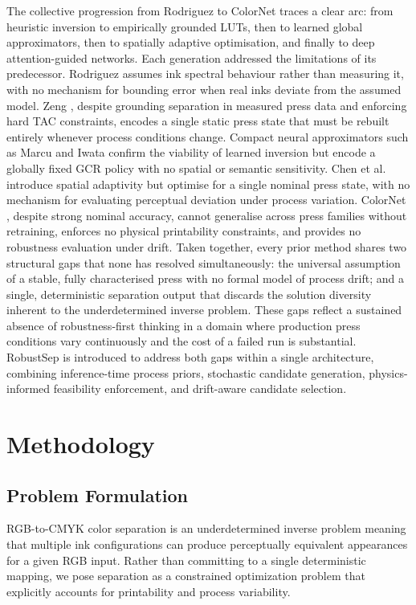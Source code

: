 \documentclass[11pt]{article}
\begin{document}
The collective progression from Rodriguez \cite{rodriguez} to ColorNet \cite{bo} traces a clear arc: from heuristic inversion to empirically grounded LUTs, then to learned global approximators, then to spatially adaptive optimisation, and finally to deep attention-guided networks. Each generation addressed the limitations of its predecessor. Rodriguez \cite{rodriguez} assumes ink spectral behaviour rather than measuring it, with no mechanism for bounding error when real inks deviate from the assumed model. Zeng \cite{zeng}, despite grounding separation in measured press data and enforcing hard TAC constraints, encodes a single static press state that must be rebuilt entirely whenever process conditions change. Compact neural approximators such as Marcu and Iwata \cite{marcu} confirm the viability of learned inversion but encode a globally fixed GCR policy with no spatial or semantic sensitivity. Chen et al.\ \cite{chen} introduce spatial adaptivity but optimise for a single nominal press state, with no mechanism for evaluating perceptual deviation under process variation. ColorNet \cite{bo}, despite strong nominal accuracy, cannot generalise across press families without retraining, enforces no physical printability constraints, and provides no robustness evaluation under drift. Taken together, every prior method shares two structural gaps that none has resolved simultaneously: the universal assumption of a stable, fully characterised press with no formal model of process drift; and a single, deterministic separation output that discards the solution diversity inherent to the underdetermined inverse problem. These gaps reflect a sustained absence of robustness-first thinking in a domain where production press conditions vary continuously and the cost of a failed run is substantial. RobustSep is introduced to address both gaps within a single architecture, combining inference-time process priors, stochastic candidate generation, physics-informed feasibility enforcement, and drift-aware candidate selection.

\section{Methodology}

\subsection{Problem Formulation}

RGB-to-CMYK color separation is an underdetermined inverse problem meaning that multiple ink configurations can produce perceptually equivalent appearances for a given RGB input. Rather than committing to a single deterministic mapping, we pose separation as a constrained optimization problem that explicitly accounts for printability and process variability.
\end{document}
